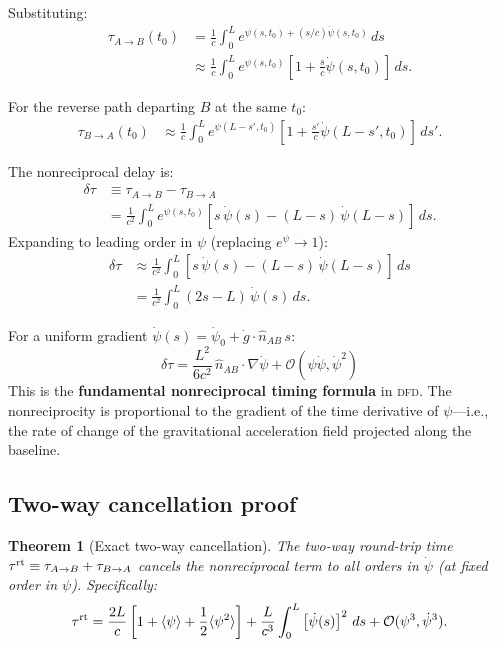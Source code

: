 \documentclass[aps,prd,twocolumn,superscriptaddress,nofootinbib,longbibliography]{revtex4-2}
\newcommand{\DFD}{\textsc{dfd}}
\newtheorem{theorem}{Theorem}
\begin{document}
Substituting:
\begin{align}\label{eq:tau-AB-timedep}
\tau_{A\to B}(t_0) &= \frac{1}{c}\int_0^{L} e^{\psi(s,t_0) + (s/c)\dot{\psi}(s,t_0)}\,ds \nonumber\\
&\approx \frac{1}{c}\int_0^{L} e^{\psi(s,t_0)}\left[1 + \frac{s}{c}\dot{\psi}(s,t_0)\right]\,ds.
\end{align}

For the reverse path departing $B$ at the same $t_0$:
\begin{align}\label{eq:tau-BA-timedep}
\tau_{B\to A}(t_0) &\approx \frac{1}{c}\int_0^{L} e^{\psi(L-s',t_0)}\left[1 + \frac{s'}{c}\dot{\psi}(L-s',t_0)\right]\,ds'.
\end{align}

The nonreciprocal delay is:
\begin{align}\label{eq:delta-tau-general}
\delta\tau &\equiv \tau_{A\to B} - \tau_{B\to A} \nonumber\\
&= \frac{1}{c^2}\int_0^L e^{\psi(s,t_0)}\left[s\,\dot{\psi}(s) - (L-s)\,\dot{\psi}(L-s)\right]\,ds.
\end{align}
Expanding to leading order in $\psi$ (replacing $e^\psi \to 1$):
\begin{align}\label{eq:delta-tau-leading}
\delta\tau &\approx \frac{1}{c^2}\int_0^L \left[s\,\dot{\psi}(s) - (L-s)\,\dot{\psi}(L-s)\right]\,ds \nonumber\\
&= \frac{1}{c^2}\int_0^L (2s - L)\,\dot{\psi}(s)\,ds.
\end{align}

For a uniform gradient $\dot{\psi}(s) = \dot{\psi}_0 + \dot{g}\cdot\hat{n}_{AB}\,s$:
\begin{equation}\label{eq:delta-tau-gradient}
\boxed{
\delta\tau = \frac{L^2}{6c^2}\,\hat{n}_{AB}\cdot\nabla\dot{\psi}
+ \mathcal{O}(\psi\dot{\psi}, \dot{\psi}^2)
}
\end{equation}
This is the \textbf{fundamental nonreciprocal timing formula} in \DFD.
The nonreciprocity is proportional to the gradient of the time derivative
of $\psi$---i.e., the rate of change of the gravitational acceleration
field projected along the baseline.

\subsection{Two-way cancellation proof}\label{sec:two-way-proof}

\begin{theorem}[Exact two-way cancellation]\label{thm:two-way}
The two-way round-trip time $\tau^{\rm rt} \equiv \tau_{A\to B} + \tau_{B\to A}$
cancels the nonreciprocal term to all orders in $\dot{\psi}$ (at fixed
order in $\psi$). Specifically:
\begin{equation}\label{eq:two-way-cancel}
\tau^{\rm rt} = \frac{2L}{c}\left[1 + \langle\psi\rangle
+ \frac{1}{2}\langle\psi^2\rangle\right]
+ \frac{L}{c^3}\int_0^L \left[\dot{\psi}(s)\right]^2\,ds + \mathcal{O}(\psi^3, \dot{\psi}^3).
\end{equation}
\end{theorem}
\end{document}
